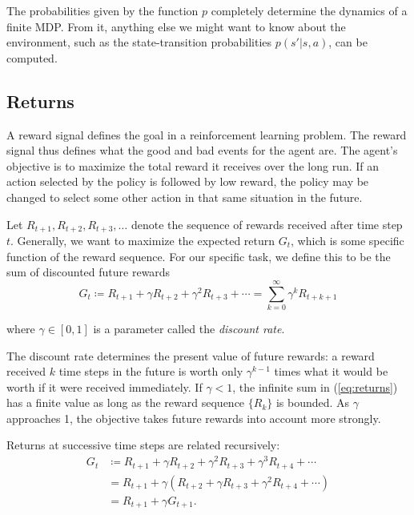 The probabilities given by the function $p$ completely determine the dynamics of a finite MDP. From it, anything else we might want to know about the environment, such as the state-transition probabilities $p(s' | s, a)$, can be computed.

\subsection{Returns}

A reward signal defines the goal in a reinforcement learning problem. The reward signal thus defines what the good and bad events for the agent are. The agent’s objective is to maximize the total reward it receives over the long run. If an action selected by the policy is followed by low reward, the policy may be changed to select some other action in that same situation in the future.

Let $R_{t+1}, R_{t+2}, R_{t+3}, \dots$ denote the sequence of rewards received after time step $t$. Generally, we want to maximize the expected return $G_t$, which is some specific function of the reward sequence. For our specific task, we define this to be the sum of discounted future rewards
\begin{equation}
    G_t \coloneqq R_{t+1} + \gamma R_{t+2} + \gamma^2 R_{t+3} + \cdots = \sum_{k=0}^{\infty} \gamma^{k}R_{t+k+1} \label{eq:returns}
\end{equation}

where $\gamma \in [0,1]$ is a parameter called the \textit{discount rate}.

The discount rate determines the present value of future rewards: a reward received $k$ time steps in the future is worth only $\gamma^{k-1}$ times what it would be worth if it were received immediately. If $\gamma < 1$, the infinite sum in (\ref{eq:returns}) has a finite value as long as the reward sequence $\{R_k\}$ is bounded. As $\gamma$ approaches 1, the objective takes future rewards into account more strongly.

Returns at successive time steps are related recursively:
\begin{align*}
    G_t &\coloneqq R_{t+1} + \gamma R_{t+2} + \gamma^2 R_{t+3} + \gamma^3 R_{t+4} + \cdots \nonumber\\
    &= R_{t+1} + \gamma (R_{t+2} + \gamma R_{t+3} + \gamma^2 R_{t+4} + \cdots) \nonumber\\
    &= R_{t+1} + \gamma G_{t+1}.
\end{align*}

